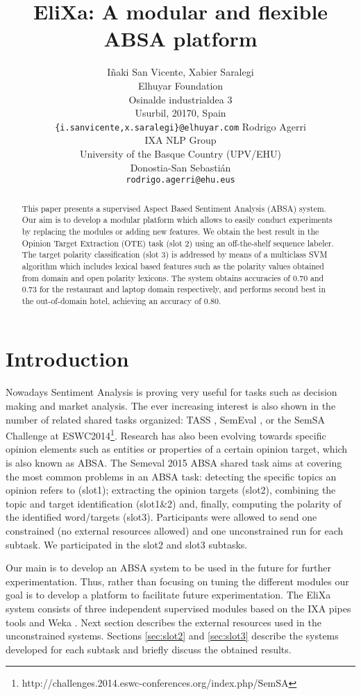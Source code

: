 \documentclass[11pt,letterpaper]{article}
\title{EliXa: A modular and flexible ABSA platform}
\author{I\~{n}aki San Vicente, Xabier Saralegi\\
	    Elhuyar Foundation\\
	    Osinalde industrialdea 3\\
	    Usurbil, 20170, Spain\\
	    \small{{\tt \{i.sanvicente,x.saralegi\}@elhuyar.com}}
	  \And
	Rodrigo Agerri\\
    IXA NLP Group\\
  	University of the Basque Country (UPV/EHU)\\
  	Donostia-San Sebasti\'{a}n\\
  \small{{\tt rodrigo.agerri@ehu.eus}}}
\date{}
\begin{document}
\maketitle
\begin{abstract}
This paper presents a supervised Aspect Based Sentiment Analysis (ABSA) system. Our aim is to develop a modular platform which allows to easily conduct experiments by replacing the modules or adding new features. We obtain the best result in the Opinion Target Extraction (OTE) task (slot 2) using an off-the-shelf sequence labeler. The target polarity classification (slot 3) is addressed by means of a multiclass SVM algorithm which includes lexical based features such as the polarity values obtained from domain and open polarity lexicons. The system obtains accuracies of 0.70 and 0.73 for the restaurant and laptop domain respectively, and performs second best in the out-of-domain hotel, achieving an accuracy of 0.80.
\end{abstract}

\section{Introduction}

Nowadays Sentiment Analysis is proving very useful for tasks such as decision making and market analysis. The ever increasing interest is also shown in the number of related shared tasks organized: TASS \cite{tass2012_overview,tass2013_overview}, SemEval \cite{semeval-2013,semeval-2014_4,semeval-2014_9}, or the SemSA Challenge at ESWC2014\footnote{http://challenges.2014.eswc-conferences.org/index.php/SemSA}. Research has also been evolving towards specific opinion elements such as entities or properties of a certain opinion target, which is also known as ABSA. The Semeval 2015 ABSA shared task aims at covering the most common problems in an ABSA task: detecting the specific topics an opinion refers to (slot1); extracting the opinion targets (slot2), combining the topic and target identification (slot1\&2) and, finally, computing the polarity of the identified word/targets (slot3). Participants were allowed to send one constrained (no external resources allowed) and one unconstrained run for each subtask. We participated in the slot2 and slot3 subtasks.

Our main is to develop an ABSA system to be used in the future for further experimentation. Thus, rather than focusing on tuning the different modules our goal is to develop a platform to facilitate future experimentation. The EliXa system consists of three independent supervised modules based on the IXA pipes tools \cite{agerri2014ixapipes} and Weka \cite{hall_weka_2009}.  Next section describes the external resources used in the unconstrained systems. Sections \ref{sec:slot2} and \ref{sec:slot3} describe the systems developed for each subtask and briefly discuss the obtained results.
\end{document}
